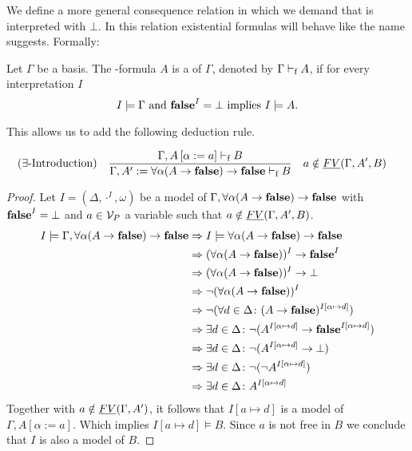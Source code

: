 We define a more general consequence relation in which we demand that \false{} is interpreted with $\bot$. In this relation existential formulas will behave like the name suggests. Formally:
\begin{definition}
Let $\Gamma$ be a basis. The \SysP-formula $A$ is a  of $\Gamma$, denoted by $\Gamma\vdash_\text{f} A$, if for every interpretation $I$
\[I\models\Gamma \text{ and } \textbf{false}^I=\bot\text{ implies }I\models A.\]

This allows us to add the following deduction rule.
\begin{mdframed}
	\begin{align*}
		  & (\exists\text{-Introduction}) &   & \frac 
		{\Gamma,A\left[\alpha:=a\right]\PModelsf B}
		{\Gamma,A':=\forall\alpha(A\to\false)\to\false\PModelsf B} && a\notin\emph{FV}(\Gamma,A',B) %
	\end{align*}
\end{mdframed}
\end{definition}
\begin{proof}
	Let $I=(\Delta,\cdot^I,\omega)$ be a model of $\Gamma,\forall\alpha(A\to\textbf{false})\to\textbf{false}$ with $\textbf{false}^I=\bot$ and $a\in\mathcal{V}_P$ a variable such that $a\notin\emph{FV}(\Gamma,A',B)$.
	\begin{align*}
		I\models\Gamma,\forall\alpha(A\to\textbf{false})\to\textbf{false} & \Rightarrow I\models\forall\alpha(A\to\textbf{false})\to\textbf{false}                                                          \\
        & \Rightarrow (\forall\alpha(A\to\textbf{false}))^I\to\textbf{false}^I                                                            \\
        & \Rightarrow (\forall\alpha(A\to\textbf{false}))^I\to\bot                                                                \\
        & \Rightarrow \neg(\forall\alpha(A\to\textbf{false}))^I                                                                   \\
        & \Rightarrow \neg(\forall d\in\Delta\colon(A\to\textbf{false})^{I\left[\alpha\mapsto d\right]})                               \\
        & \Rightarrow \exists d\in\Delta\colon\neg(A^{I\left[\alpha\mapsto d\right]}\to\textbf{false}^{I\left[\alpha\mapsto d\right]}) \\
        & \Rightarrow \exists d\in\Delta\colon\neg(A^{I\left[\alpha\mapsto d\right]}\to\bot)                                   \\
        & \Rightarrow \exists d\in\Delta\colon\neg(\neg A^{I\left[\alpha\mapsto d\right]})                                     \\
        & \Rightarrow \exists d\in\Delta\colon A^{I\left[\alpha\mapsto d\right]}
	\end{align*}
	Together with $a\notin\emph{FV}(\Gamma,A')$, it follows that $I\left[a\mapsto d\right]$ is a model of $\Gamma,A\left[\alpha:=a\right]$. Which implies $I\left[a\mapsto d\right]\models B$.	Since $a$ is not free in $B$ we conclude that $I$ is also a model of $B$.
\end{proof}
